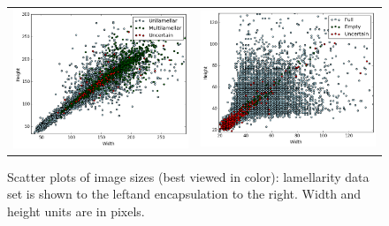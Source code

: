 \documentclass[a4paper, 11pt, table]{article}
\begin{document}
\begin{figure}[H]
\centering
\begin{tabular}{cc}
\includegraphics[scale=0.32]{img_size/lamellarity/scatter_plot_width_height.png} & \includegraphics[scale=0.32]{img_size/encapsulation/scatter_plot_width_height.png}
\end{tabular}
\caption{Scatter plots of image sizes (best viewed in color): lamellarity data set is shown to the leftand encapsulation to the right. Width and height units are in pixels.}
\label{fig:img_size_scatter_plot}
\end{figure}
\end{document}
